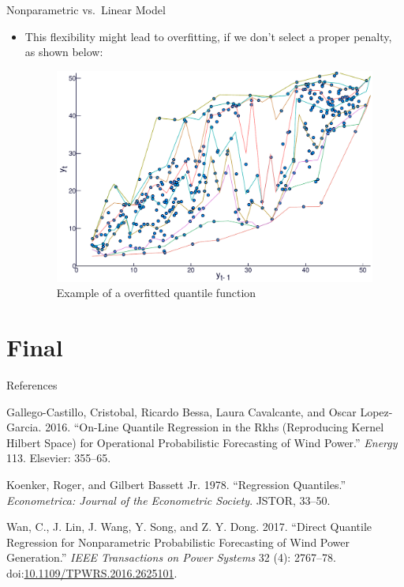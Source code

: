 \begin{frame}{Nonparametric vs.~Linear Model}

\begin{itemize}
\tightlist
\item
  This flexibility might lead to overfitting, if we don't select a
  proper penalty, as shown below:

  \begin{figure}
          \centering     \includegraphics[width=0.6 \textwidth]{../Figuras/regressao-quantilica/icaraizinho-crossing-01}
  \caption{Example of a overfitted quantile function}
  \label{fig:convergence}
  \end{figure}
\end{itemize}

\end{frame}

\section{Final}\label{final}

\begin{frame}{References}

\tiny

\hypertarget{refs}{}
\hypertarget{ref-gallego2016line}{}
Gallego-Castillo, Cristobal, Ricardo Bessa, Laura Cavalcante, and Oscar
Lopez-Garcia. 2016. ``On-Line Quantile Regression in the Rkhs
(Reproducing Kernel Hilbert Space) for Operational Probabilistic
Forecasting of Wind Power.'' \emph{Energy} 113. Elsevier: 355--65.

\hypertarget{ref-koenker1978regression}{}
Koenker, Roger, and Gilbert Bassett Jr. 1978. ``Regression Quantiles.''
\emph{Econometrica: Journal of the Econometric Society}. JSTOR, 33--50.

\hypertarget{ref-wan_direct_2017}{}
Wan, C., J. Lin, J. Wang, Y. Song, and Z. Y. Dong. 2017. ``Direct
Quantile Regression for Nonparametric Probabilistic Forecasting of Wind
Power Generation.'' \emph{IEEE Transactions on Power Systems} 32 (4):
2767--78.
doi:\href{https://doi.org/10.1109/TPWRS.2016.2625101}{10.1109/TPWRS.2016.2625101}.

\end{frame}
